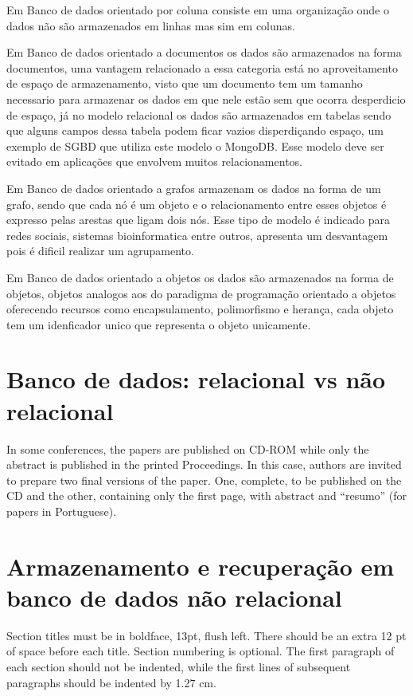 \documentclass[12pt]{article}
\begin{document}
Em Banco de dados orientado por coluna consiste em uma organização onde o dados não são armazenados em linhas mas sim em colunas. %

Em Banco de dados orientado a documentos os dados são armazenados na forma documentos, uma vantagem relacionado a essa categoria está no aproveitamento de espaço de armazenamento, visto que um documento tem um tamanho necessario para armazenar os dados em que nele estão sem que ocorra desperdicio de espaço, já no modelo relacional os dados são armazenados em tabelas sendo que alguns campos dessa tabela podem ficar vazios disperdiçando espaço, um exemplo de SGBD que utiliza este modelo o MongoDB. Esse modelo deve ser evitado em aplicações que envolvem muitos relacionamentos.

Em Banco de dados orientado a grafos armazenam os dados na forma de um grafo, sendo que cada nó é um objeto e o relacionamento entre esses objetos é expresso pelas arestas que ligam dois nós. Esse tipo de modelo é indicado para redes sociais, sistemas bioinformatica entre outros, apresenta um desvantagem pois é dificil realizar um agrupamento. 

Em Banco de dados orientado a objetos os dados são armazenados na forma de objetos, objetos analogos aos do paradigma de programação orientado a objetos oferecendo recursos como encapsulamento, polimorfismo e herança, cada objeto tem um idenficador unico que representa o objeto unicamente. 


\section{Banco de dados: relacional vs não relacional}

In some conferences, the papers are published on CD-ROM while only the
abstract is published in the printed Proceedings. In this case, authors are
invited to prepare two final versions of the paper. One, complete, to be
published on the CD and the other, containing only the first page, with
abstract and ``resumo'' (for papers in Portuguese).

\section{Armazenamento e recuperação em banco de dados não relacional}

Section titles must be in boldface, 13pt, flush left. There should be an extra
12 pt of space before each title. Section numbering is optional. The first
paragraph of each section should not be indented, while the first lines of
subsequent paragraphs should be indented by 1.27 cm.
\end{document}
